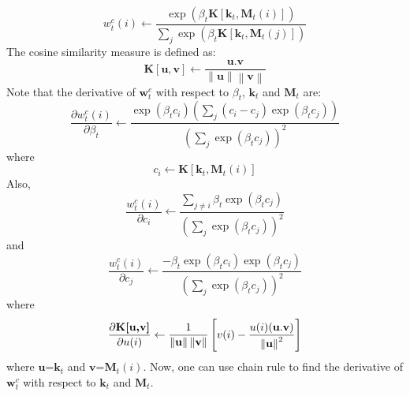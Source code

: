 \begin{equation}
w_t^c(i) \leftarrow \frac{\exp{(\beta_t\textbf{K}[\textbf{k}_t,\textbf{M}_t(i)])}}{\sum_{j}{} \exp{(\beta_t\textbf{K}[\textbf{k}_t,\textbf{M}_t(j)])}}
\end{equation}
\noindent
The cosine similarity measure is defined as:
\begin{equation}
\textbf{K}[\textbf{u},\textbf{v}] \leftarrow \frac{\textbf{u}.\textbf{v}}{\left \| \textbf{u} \right \|\left \| \textbf{v} \right \|}
\end{equation}
\noindent
Note that the derivative of $\textbf{w}_t^c$ with respect to $\beta_t$, $\textbf{k}_t$ and  $\textbf{M}_t$ are:
\begin{equation}
\frac{\partial w_t^c(i)}{\partial \beta_t} \leftarrow \frac{\exp{(\beta_tc_i)}(\sum_{j} (c_i-c_j)\exp{(\beta_tc_j)})}{(\sum_{j} \exp{(\beta_tc_j)})^2}
\end{equation}
\noindent
where
\begin{equation}
c_i \leftarrow \textbf{K}[\textbf{k}_t,\textbf{M}_t(i)]
\end{equation}
\noindent
Also,
\begin{equation}
\frac{w_t^c(i)}{\partial c_i} \leftarrow \frac{\sum_{j\neq i} \beta_t\exp{(\beta_tc_j)}}{(\sum_{j} \exp{(\beta_tc_j)})^2}
\end{equation}
\noindent
and
\begin{equation}
\frac{w_t^c(i)}{\partial c_j} \leftarrow \frac{-\beta_t\exp{(\beta_tc_i)}\exp{(\beta_tc_j)}}{(\sum_{j} \exp{(\beta_tc_j)})^2}
\end{equation}
\noindent
where
\begin{equation}
\frac{\partial \textbf{K[\textbf{u},\textbf{v}]}}{ \partial u(i)} \leftarrow \frac{1}{\left \| \textbf{u} \right \|\left \| \textbf{v} \right \|}\left [ v(i) - \frac{u(i)(\textbf{u}.\textbf{v})}{\left \| \textbf{u} \right \|^2} \right ]
\end{equation}
\noindent
where $\textbf{u}$=$\textbf{k}_t$ and $\textbf{v}$=$\textbf{M}_t(i)$. Now, one can use chain rule to find the derivative of  $\textbf{w}_t^c$ with respect to $\textbf{k}_t$ and  $\textbf{M}_t$.

